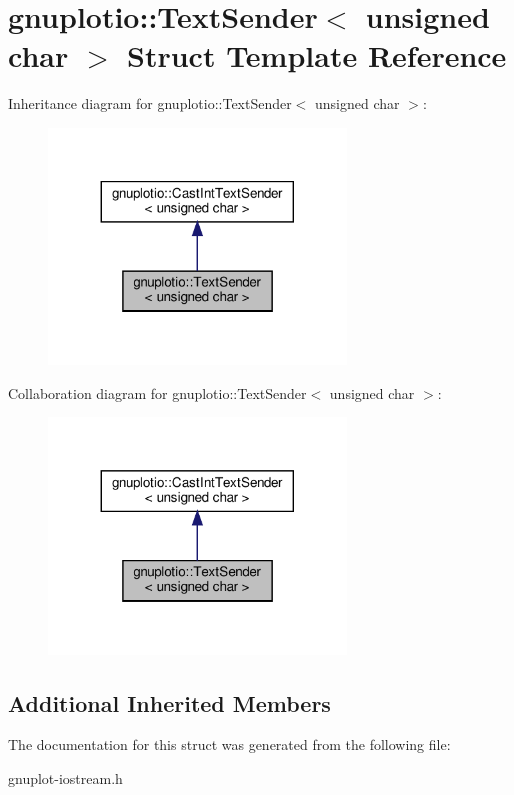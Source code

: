 \hypertarget{structgnuplotio_1_1TextSender_3_01unsigned_01char_01_4}{}\section{gnuplotio\+:\+:Text\+Sender$<$ unsigned char $>$ Struct Template Reference}
\label{structgnuplotio_1_1TextSender_3_01unsigned_01char_01_4}


Inheritance diagram for gnuplotio\+:\+:Text\+Sender$<$ unsigned char $>$\+:
\nopagebreak
\begin{figure}[H]
\begin{center}
\leavevmode
\includegraphics[width=224pt]{structgnuplotio_1_1TextSender_3_01unsigned_01char_01_4__inherit__graph}
\end{center}
\end{figure}


Collaboration diagram for gnuplotio\+:\+:Text\+Sender$<$ unsigned char $>$\+:
\nopagebreak
\begin{figure}[H]
\begin{center}
\leavevmode
\includegraphics[width=224pt]{structgnuplotio_1_1TextSender_3_01unsigned_01char_01_4__coll__graph}
\end{center}
\end{figure}
\subsection*{Additional Inherited Members}


The documentation for this struct was generated from the following file\+:\begin{DoxyCompactItemize}
\item 
gnuplot-\/iostream.\+h\end{DoxyCompactItemize}
